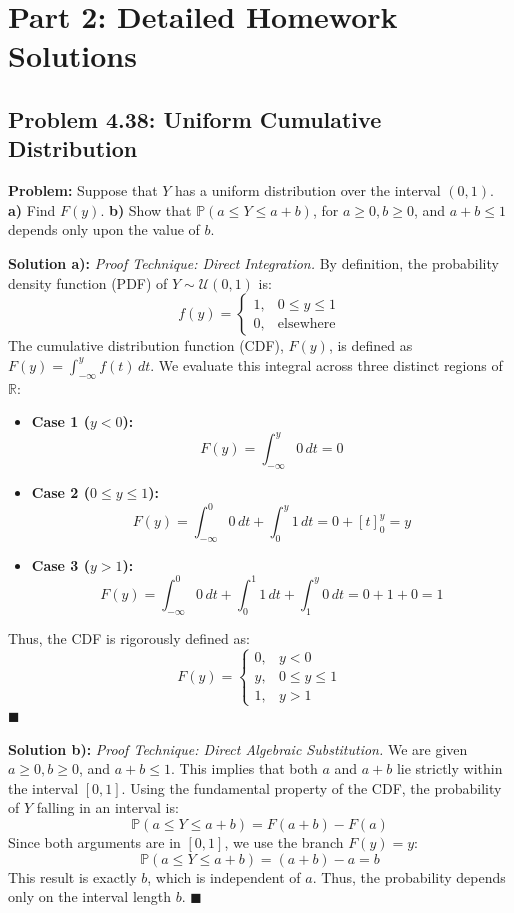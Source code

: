 \documentclass[11pt, a4paper]{article}
\theoremstyle{definition}
\theoremstyle{remark}
\newcommand{\R}{\mathbb{R}}
\newcommand{\Prob}{\mathbb{P}}
\begin{document}
\newpage
\section{Part 2: Detailed Homework Solutions}

\subsection{Problem 4.38: Uniform Cumulative Distribution}
\textbf{Problem:} Suppose that $Y$ has a uniform distribution over the interval $(0, 1)$.
\textbf{a)} Find $F(y)$.
\textbf{b)} Show that $\Prob(a \le Y \le a + b)$, for $a \ge 0, b \ge 0$, and $a + b \le 1$ depends only upon the value of $b$.

\textbf{Solution a):}
\textit{Proof Technique: Direct Integration.}
By definition, the probability density function (PDF) of $Y \sim \mathcal{U}(0,1)$ is:
\[ f(y) = \begin{cases} 1, & 0 \le y \le 1 \\ 0, & \text{elsewhere} \end{cases} \]
The cumulative distribution function (CDF), $F(y)$, is defined as $F(y) = \int_{-\infty}^{y} f(t) \, dt$. We evaluate this integral across three distinct regions of $\R$:
\begin{itemize}
    \item \textbf{Case 1 ($y < 0$):} 
    \[ F(y) = \int_{-\infty}^{y} 0 \, dt = 0 \]
    \item \textbf{Case 2 ($0 \le y \le 1$):} 
    \[ F(y) = \int_{-\infty}^{0} 0 \, dt + \int_{0}^{y} 1 \, dt = 0 + [t]_{0}^{y} = y \]
    \item \textbf{Case 3 ($y > 1$):} 
    \[ F(y) = \int_{-\infty}^{0} 0 \, dt + \int_{0}^{1} 1 \, dt + \int_{1}^{y} 0 \, dt = 0 + 1 + 0 = 1 \]
\end{itemize}
Thus, the CDF is rigorously defined as:
\[ F(y) = \begin{cases} 0, & y < 0 \\ y, & 0 \le y \le 1 \\ 1, & y > 1 \end{cases} \]
$\blacksquare$

\textbf{Solution b):}
\textit{Proof Technique: Direct Algebraic Substitution.}
We are given $a \ge 0, b \ge 0$, and $a + b \le 1$. This implies that both $a$ and $a+b$ lie strictly within the interval $[0, 1]$.
Using the fundamental property of the CDF, the probability of $Y$ falling in an interval is:
\[ \Prob(a \le Y \le a + b) = F(a + b) - F(a) \]
Since both arguments are in $[0, 1]$, we use the branch $F(y) = y$:
\[ \Prob(a \le Y \le a + b) = (a + b) - a = b \]
This result is exactly $b$, which is independent of $a$. Thus, the probability depends only on the interval length $b$.
$\blacksquare$
\end{document}
